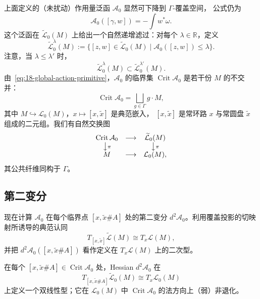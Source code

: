 上面定义的（未扰动）作用量泛函 $\mathcal A_0$ 显然可下降到 $\Gamma$-覆盖空间，
公式仍为
\[
 \mathcal A_0([\gamma,w])=-\int w^*\omega.
\]
这个泛函在 $\widetilde{\mathcal L}_0(M)$ 上给出一个自然递增滤过：对每个
$\lambda\in\mathbb R$，定义
\[
 \widetilde{\mathcal L}_0^\lambda(M):=
 \{[z,w]\in\widetilde{\mathcal L}_0(M)\mid
   \mathcal A_0([z,w])\leq\lambda\}.
\]
注意，当 $\lambda\leq\lambda'$ 时，
\[
 \widetilde{\mathcal L}_0^\lambda(M)
 \subset\widetilde{\mathcal L}_0^{\lambda'}(M).
\]
由~\eqref{eq:18-global-action-primitive}，$\mathcal A_0$ 的临界集
$\operatorname{Crit}\mathcal A_0$ 是若干份 $M$ 的不交并：
\[
 \operatorname{Crit}\mathcal A_0=\bigsqcup_{g\in\Gamma}g\cdot M,
\]
其中 $M\hookrightarrow\mathcal L_0(M)$，$x\mapsto[x,\widetilde x]$ 是典范嵌入，
$[x,\widetilde x]$ 是常环路 $x$ 与常圆盘 $\widetilde x$ 组成的二元组。我们有自然交换图
\[
 \begin{array}{ccc}
  \operatorname{Crit}\mathcal A_0&\longrightarrow&
    \widetilde{\mathcal L}_0(M)\\
  \big\downarrow\scriptstyle\pi&&\big\downarrow\scriptstyle\pi\\
  M&\longrightarrow&\mathcal L_0(M),
 \end{array}
\]
其公共纤维同构于 $\Gamma$。

\subsection{第二变分}
\label{subsec:unperturbed-action-second-variation}

现在计算 $\mathcal A_0$ 在每个临界点 $[x,\widetilde x\#A]$ 处的第二变分
$d^2\mathcal A_0$。利用覆盖投影的切映射所诱导的典范认同
\begin{equation}
 T_{[x,\widetilde x]}\widetilde{\mathcal L}(M)
 \cong T_x\mathcal L(M),
 \label{eq:18-cover-tangent-identification}
\end{equation}
并把 $d^2\mathcal A_0([x,\widetilde x\#A])$ 看作定义在
$T_x\mathcal L(M)$ 上的二次型。

\begin{proposition}
\label{prop:18-unperturbed-action-bott-morse}
在每个 $[x,\widetilde x\#A]\in\operatorname{Crit}\mathcal A_0$ 处，Hessian
$d^2\mathcal A_0$ 在
\[
 T_{[x,\widetilde x\#A]}\widetilde{\mathcal L}_0(M)
 \cong T_x\mathcal L_0(M)
\]
上定义一个双线性型；它在 $\mathcal L_0(M)$ 中
$\operatorname{Crit}\mathcal A_0$ 的法方向上（弱）非退化。
\end{proposition}

